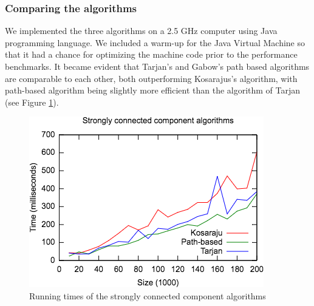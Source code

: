 \documentclass[english]{tktltiki2}
\theoremstyle{definition}
\theoremstyle{remark}
\begin{document}
\subsubsection{Comparing the algorithms}
We implemented the three algorithms on a 2.5 GHz computer using Java programming language. We included a warm-up for the Java Virtual Machine so that it had a chance for optimizing the machine code prior to the performance benchmarks. It became evident that Tarjan's and Gabow's path based algorithms are comparable to each other, both outperforming Kosarajus's algorithm, with path-based algorithm being slightly more efficient than the algorithm of Tarjan (see Figure \ref{fig:sccrunningtime}).
\begin{figure}[H]
  \centering
  \includegraphics{SCCDataCropped}
  \caption{Running times of the strongly connected component algorithms}
  \label{fig:sccrunningtime}
\end{figure}







% 
\end{document}
